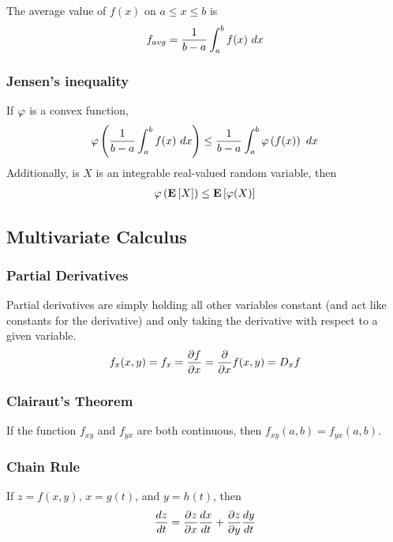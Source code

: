 The average value of $f(x)$ on $a\leq x\leq b$ is
\begin{align*}
	f_{avg}=\frac{1}{b-a}\int_a^b f(x)\ dx
\end{align*}

\subsubsection*{Jensen's inequality}

If $\varphi$ is a convex function,
\begin{align*}
	\varphi\left(\frac{1}{b-a}\int_a^b f(x)\ dx\right)\leq\frac{1}{b-a}\int_a^b\varphi\left(f(x)\right)\ dx
\end{align*}
Additionally, is $X$ is an integrable real-valued random variable, then
\begin{align*}
	\varphi\left(\mathbf{E}\left[X\right]\right)\leq\mathbf{E}\left[\varphi(X)\right]
\end{align*}

\subsection{Multivariate Calculus}

\subsubsection*{Partial Derivatives}

Partial derivatives are simply holding all other variables constant (and act like constants for the derivative) and only taking the derivative with respect to a given variable.
\begin{align*}
	f_x(x,y)=f_x=\frac{\partial f}{\partial x}=\frac{\partial}{\partial x}f(x,y)=D_x f
\end{align*}

\subsubsection*{Clairaut's Theorem}

If the function $f_{xy}$ and $f_{yx}$ are both continuous, then $f_{xy}(a,b)=f_{yx}(a,b)$.

\subsubsection*{Chain Rule}

If $z=f(x,y)$, $x=g(t)$, and $y=h(t)$, then
\begin{align*}
	\frac{dz}{dt}=\frac{\partial z}{\partial x}\frac{dx}{dt}+\frac{\partial z}{\partial y}\frac{dy}{dt}
\end{align*}

